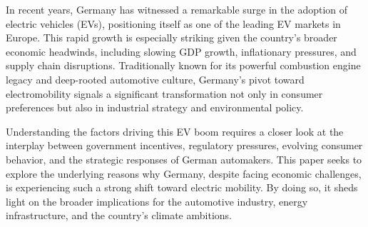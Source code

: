 In recent years, Germany has witnessed a remarkable surge in the adoption of electric vehicles (EVs), positioning itself as one of the leading EV markets in Europe. This rapid growth is especially striking given the country’s broader economic headwinds, including slowing GDP growth, inflationary pressures, and supply chain disruptions. Traditionally known for its powerful combustion engine legacy and deep-rooted automotive culture, Germany's pivot toward electromobility signals a significant transformation not only in consumer preferences but also in industrial strategy and environmental policy.

Understanding the factors driving this EV boom requires a closer look at the interplay between government incentives, regulatory pressures, evolving consumer behavior, and the strategic responses of German automakers. This paper seeks to explore the underlying reasons why Germany, despite facing economic challenges, is experiencing such a strong shift toward electric mobility. By doing so, it sheds light on the broader implications for the automotive industry, energy infrastructure, and the country’s climate ambitions.